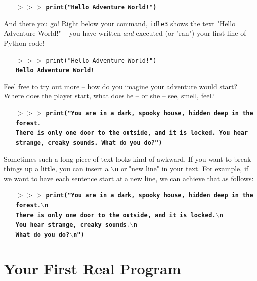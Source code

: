 \begin{itemize}
\item[$>>>$] \textbf{\texttt{print("Hello Adventure World!")}}
\end{itemize}

And there you go! Right below your command, \texttt{idle3} shows the text "Hello Adventure World!" -- you have written \emph{and} executed (or "ran") your first line of Python code!

\begin{itemize}
\item[$>>>$] \texttt{print("Hello Adventure World!")}\\
	\textbf{\texttt{Hello Adventure World!}}
\end{itemize}

Feel free to try out more -- how do you imagine your adventure would start? Where does the player start, what does he -- or she -- see, smell, feel? 

\begin{itemize}
\item[$>>>$] \textbf{\texttt{print("You are in a dark, spooky house, hidden deep in the forest. \\ 
		   There is only one door to the outside, and it is locked. You hear \\ 
		   strange, creaky sounds. What do you do?")}}
\end{itemize}
   
Sometimes such a long piece of text looks kind of awkward. If you want to break things up a little, you can insert a \texttt{$\backslash$n} or "new line" in your text. For example, if we want to have each sentence start at a new line, we can achieve that as follows: 

\begin{itemize}
\item[$>>>$] \textbf{\texttt{print("You are in a dark, spooky house, hidden deep in the forest.$\backslash$n\\ 
		   There is only one door to the outside, and it is locked.$\backslash$n \\
		   You hear strange, creaky sounds.$\backslash$n\\
		   What do you do?$\backslash$n")}}
\end{itemize}
   

\section{Your First Real Program}    
   
